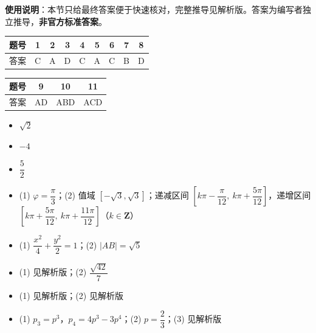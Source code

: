
\begin{gknotice}
\textbf{使用说明}：本节只给最终答案便于快速核对，完整推导见解析版。答案为编写者独立推导，\textbf{非官方标准答案}。
\end{gknotice}

\begin{center}\begin{tabular}{ccccccccc}
\toprule
题号 & 1 & 2 & 3 & 4 & 5 & 6 & 7 & 8 \\
\midrule
答案 & C & A & D & C & A & C & B & D \\
\bottomrule
\end{tabular}\end{center}

\begin{center}\begin{tabular}{cccc}
\toprule
题号 & 9 & 10 & 11 \\
\midrule
答案 & AD & ABD & ACD \\
\bottomrule
\end{tabular}\end{center}

\begin{itemize}[leftmargin=2.6em]
  \item[\textbf{12.}] $\sqrt2$
  \item[\textbf{13.}] $-4$
  \item[\textbf{14.}] $\dfrac52$
\end{itemize}

\begin{itemize}[leftmargin=2.6em]
  \item[\textbf{15.}] (1) $\varphi=\dfrac\pi3$；(2) 值域 $\left[-\sqrt3,\sqrt3\right]$；递减区间 $\left[k\pi-\dfrac\pi{12},\ k\pi+\dfrac{5\pi}{12}\right]$，递增区间 $\left[k\pi+\dfrac{5\pi}{12},\ k\pi+\dfrac{11\pi}{12}\right]$（$k\in\mathbf Z$）
  \item[\textbf{16.}] (1) $\dfrac{x^2}{4}+\dfrac{y^2}{2}=1$；(2) $|AB|=\sqrt5$
  \item[\textbf{17.}] (1) 见解析版；(2) $\dfrac{\sqrt{42}}{7}$
  \item[\textbf{18.}] (1) 见解析版；(2) 见解析版
  \item[\textbf{19.}] (1) $p_3=p^3$，$p_4=4p^3-3p^4$；(2) $p=\dfrac23$；(3) 见解析版
\end{itemize}
